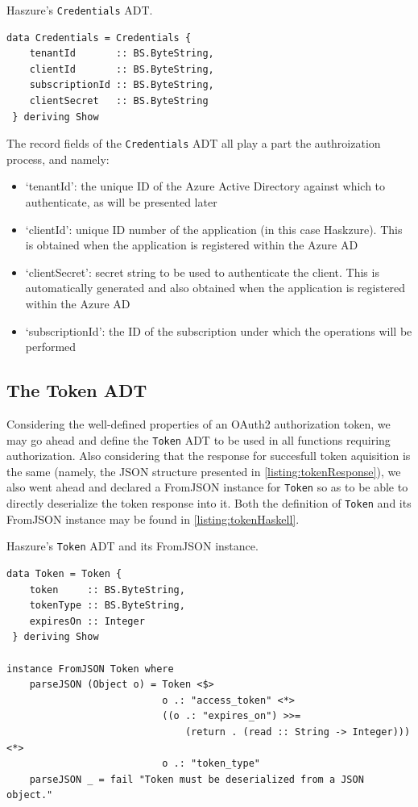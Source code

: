 \documentclass[11pt]{report}
\begin{document}
\begin{listing}[H]
\label{listing:credentialsHaskell}
\caption{Haszure's \texttt{Credentials} ADT.}
\begin{verbatim}
data Credentials = Credentials {
    tenantId       :: BS.ByteString,
    clientId       :: BS.ByteString,
    subscriptionId :: BS.ByteString,
    clientSecret   :: BS.ByteString
 } deriving Show
\end{verbatim}
\end{listing}

The record fields of the \texttt{Credentials} ADT all play a part the
authroization process, and namely:

\begin{itemize}
    \item{`tenantId'}: the unique ID of the Azure Active Directory against
        which to authenticate, as will be presented later
    \item{`clientId'}: unique ID number of the application (in this case
        Haskzure). This is obtained when the application is registered within
        the Azure AD
    \item{`clientSecret'}: secret string to be used to authenticate the client.
        This is automatically generated and also obtained when the application
        is registered within the Azure AD
    \item{`subscriptionId'}: the ID of the subscription under which the
        operations will be performed
\end{itemize}

\subsection{The Token ADT}

Considering the well-defined properties of an OAuth2 authorization token, we
may go ahead and define the \texttt{Token} ADT to be used in all functions
requiring authorization. Also considering that the response for succesfull
token aquisition is the same (namely, the JSON structure presented in
\autoref{listing:tokenResponse}), we also went ahead and declared a FromJSON
instance for \texttt{Token} so as to be able to directly deserialize the token
response into it. Both the definition of \texttt{Token} and its FromJSON
instance may be found in \autoref{listing:tokenHaskell}.

\begin{listing}[H]
\label{listing:tokenHaskell}
\caption{Haszure's \texttt{Token} ADT and its FromJSON instance.}
\begin{verbatim}
data Token = Token {
    token     :: BS.ByteString,
    tokenType :: BS.ByteString,
    expiresOn :: Integer
 } deriving Show

instance FromJSON Token where
    parseJSON (Object o) = Token <$>
                           o .: "access_token" <*>
                           ((o .: "expires_on") >>=
                               (return . (read :: String -> Integer))) <*>
                           o .: "token_type"
    parseJSON _ = fail "Token must be deserialized from a JSON object."
\end{verbatim}
\end{listing}
\end{document}
